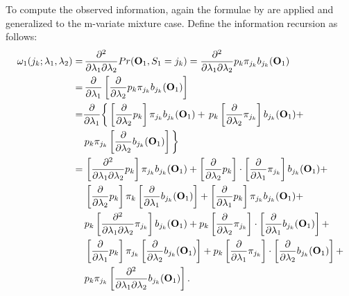 \documentclass[a4paper,man,nobf]{apa}
\newcommand{\vc}{\mathbf}
\begin{document}
To compute the observed information, again the formulae by 
\citet{Lys2002} are applied and generalized to the m-variate mixture 
case. Define the information recursion as follows:
\begin{align}
\begin{split}
	\omega_{1}(j_{k};\lambda_{1},\lambda_{2}) 
	=  & \, \fps Pr(\vc{O}_{1}, S_{1}=j_{k}) = \fps p_{k} \pi_{j_{k}} 
b_{j_{k}}(\vc{O}_{1})
	\\  = & \, \fpp \left[ \fpt p_{k} \pi_{j_{k}} b_{j_{k}}(\vc{O}_{1}) 
\right] 
	\\  =  & \fpp  \bigg\{  \left[ \fpt p_{k} \right]  \pi_{j_{k}} 
b_{j_{k}}(\vc{O}_{1}) +
		\, p_{k} \left[ \fpt \pi_{j_{k}} \right]  b_{j_{k}}(\vc{O}_{1}) + 
	\\  &  \, p_{k} \pi_{j_{k}} \left[ \fpt  b_{j_{k}}(\vc{O}_{1}) 
\right] \bigg\}
	\\  =  & \,  \left[ \fps p_{k} \right] \pi_{j_{k}} 
b_{j_{k}}(\vc{O}_{1}) + 
		\left[ \fpt p_{k} \right] \cdot \left[\fpp \pi_{j_{k}} \right] 
b_{j_{k}}(\vc{O}_{1}) +
	\\  &   \, \left[ \fpt p_{k} \right] \pi_{k} \left[ \fpp b_{j_{k}} 
(\vc{O}_{1}) \right] +
		\left[ \fpp p_{k} \right] \pi_{j_{k}} b_{j_{k}}(\vc{O}_{1}) + 
	\\ &   \, p_{k} \left[ \fps \pi_{j_{k}} \right] 
b_{j_{k}}(\vc{O}_{1}) +
		p_{k} \left[ \fpt \pi_{j_{k}} \right] \cdot \left[ \fpp 
b_{j_{k}}(\vc{O}_{1}) \right] +
	\\ &   \, \left[ \fpp p_{k} \right] \pi_{j_{k}} \left[ \fpt 
b_{j_{k}}(\vc{O}_{1}) \right] +
		p_{k} \left[ \fpp \pi_{j_{k}} \right] \cdot \left[ \fpt 
b_{j_{k}}(\vc{O}_{1}) \right] +
	\\ &   \, p_{k} \pi_{j_{k}} \left[ \fps b_{j_{k}}(\vc{O}_{1}) 
\right].
\end{split}
\end{align}
\end{document}
